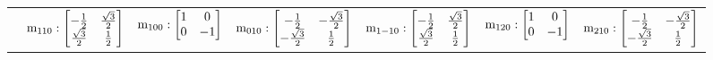 \documentclass[fleqn,8pt,landscape]{jsarticle}
\begin{document}
\begin{longtable}{ccccccc}
& $ {\rm m}_{110}:\begin{bmatrix} - \frac{1}{2} & \frac{\sqrt{3}}{2} \\ \frac{\sqrt{3}}{2} & \frac{1}{2} \end{bmatrix} $ & $ {\rm m}_{100}:\begin{bmatrix} 1 & 0 \\ 0 & -1 \end{bmatrix} $ & $ {\rm m}_{010}:\begin{bmatrix} - \frac{1}{2} & - \frac{\sqrt{3}}{2} \\ - \frac{\sqrt{3}}{2} & \frac{1}{2} \end{bmatrix} $ & $ {\rm m}_{1-10}:\begin{bmatrix} - \frac{1}{2} & \frac{\sqrt{3}}{2} \\ \frac{\sqrt{3}}{2} & \frac{1}{2} \end{bmatrix} $ & $ {\rm m}_{120}:\begin{bmatrix} 1 & 0 \\ 0 & -1 \end{bmatrix} $ & $ {\rm m}_{210}:\begin{bmatrix} - \frac{1}{2} & - \frac{\sqrt{3}}{2} \\ - \frac{\sqrt{3}}{2} & \frac{1}{2} \end{bmatrix} $ \\
\end{longtable}
\end{document}
